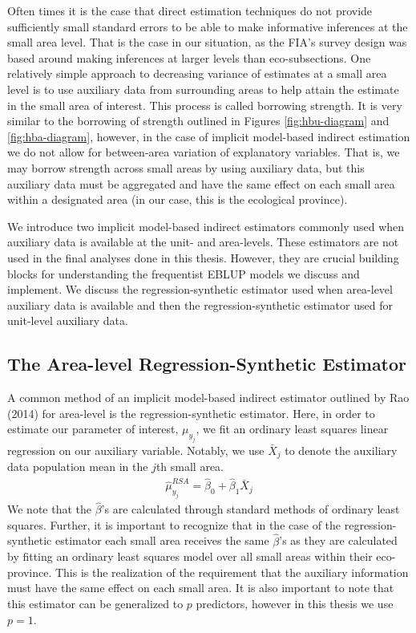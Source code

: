 \documentclass[12pt,twoside]{reedthesis}
\begin{document}
Often times it is the case that direct estimation techniques do not provide sufficiently small standard errors to be able to make informative inferences at the small area level. That is the case in our situation, as the FIA's survey design was based around making inferences at larger levels than eco-subsections. One relatively simple approach to decreasing variance of estimates at a small area level is to use auxiliary data from surrounding areas to help attain the estimate in the small area of interest. This process is called borrowing strength. It is very similar to the borrowing of strength outlined in Figures \ref{fig:hbu-diagram} and \ref{fig:hba-diagram}, however, in the case of implicit model-based indirect estimation we do not allow for between-area variation of explanatory variables. That is, we may borrow strength across small areas by using auxiliary data, but this auxiliary data must be aggregated and have the same effect on each small area within a designated area (in our case, this is the ecological province).

We introduce two implicit model-based indirect estimators commonly used when auxiliary data is available at the unit- and area-levels. These estimators are not used in the final analyses done in this thesis. However, they are crucial building blocks for understanding the frequentist EBLUP models we discuss and implement. We discuss the regression-synthetic estimator used when area-level auxiliary data is available and then the regression-synthetic estimator used for unit-level auxiliary data.

\hypertarget{the-area-level-regression-synthetic-estimator}{%
\subsection{The Area-level Regression-Synthetic Estimator}\label{the-area-level-regression-synthetic-estimator}}

A common method of an implicit model-based indirect estimator outlined by Rao (2014) for area-level is the regression-synthetic estimator. Here, in order to estimate our parameter of interest, \(\mu_{y_j}\), we fit an ordinary least squares linear regression on our auxiliary variable. Notably, we use \(\bar X_j\) to denote the auxiliary data population mean in the \(j\)th small area.
\begin{align}
\hat\mu_{y_j}^{RSA} = \hat\beta_0 + \hat\beta_1 \bar X_{j}
\end{align}
We note that the \(\hat \beta\)'s are calculated through standard methods of ordinary least squares. Further, it is important to recognize that in the case of the regression-synthetic estimator each small area receives the same \(\hat\beta\)'s as they are calculated by fitting an ordinary least squares model over all small areas within their eco-province. This is the realization of the requirement that the auxiliary information must have the same effect on each small area. It is also important to note that this estimator can be generalized to \(p\) predictors, however in this thesis we use \(p=1\).
\end{document}
